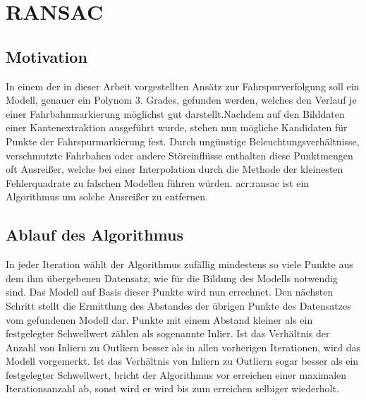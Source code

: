 \section{RANSAC}
\subsection{Motivation}
In einem der in dieser Arbeit vorgestellten Ansätz zur Fahrspurverfolgung soll ein Modell, genauer ein Polynom 3. Grades, gefunden werden, welches den Verlauf je einer Fahrbahnmarkierung möglichst gut darstellt.Nachdem auf den Bilddaten einer Kantenextraktion ausgeführt wurde, stehen nun mögliche Kandidaten für Punkte der Fahrspurmarkierung fest. Durch ungünstige Beleuchtungsverhältnisse, verschmutzte Fahrbahen oder andere Störeinflüsse enthalten diese Punktmengen oft Ausreißer, welche bei einer Interpolation durch die Methode der kleinesten Fehlerquadrate zu falschen Modellen führen würden. \gls{acr:ransac} \autocite{fischler1981random} ist ein Algorithmus um solche Ausreißer zu entfernen.

\subsection{Ablauf des Algorithmus}
In jeder Iteration wählt der Algorithmus zufällig mindestens so viele Punkte aus dem ihm übergebenen Datensatz, wie für die Bildung des Modells notwendig sind. Das Modell auf Basis dieser Punkte wird nun errechnet. Den nächsten Schritt stellt die Ermittlung des Abstandes der übrigen Punkte des Datensatzes vom gefundenen Modell dar. Punkte mit einem Abstand kleiner als ein festgelegter Schwellwert zählen als sogenannte Inlier. Ist das Verhältnis der Anzahl von Inliern zu Outliern besser als in allen vorherigen Iterationen, wird das Modell vorgemerkt. Ist das Verhältnis von Inliern zu Outliern sogar besser als ein festgelegter Schwellwert, bricht der Algorithmus vor erreichen einer maximalen Iterationsanzahl ab, sonst wird er wird bis zum erreichen selbiger wiederholt.




